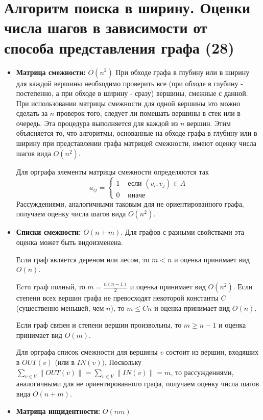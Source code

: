 \documentclass[40pt]{article}
\begin{document}
\section{Алгоритм поиска в ширину. Оценки числа шагов в зависимости от способа представления графа (28)}

\begin{itemize}
    \item \textbf{Матрица смежности: } $O\left(n^{2}\right)$
        При обходе графа в глубину или в ширину для каждой вершины необходимо проверить все (при обходе в глубину - постепенно, а при обходе в ширину - сразу) вершины, смежные с данной. При использовании матрицы смежности для одной вершины это можно сделать за $n$ проверок того, следует ли помешать вершины в стек или в очередь. Эта процедура выполняется для каждой из $n$ вершин. Этим объясняется то, что алгоритмы, основанные на обходе графа в глубину или в ширину при представлении графа матрицей смежности, имеют оценку числа шагов вида $O\left(n^{2}\right)$.

Для орграфа элементы матрицы смежности определяются так
$$
a_{i j}=\left\{\begin{array}{ll}
1 & \text { если }\left(v_{i}, v_{j}\right) \in A \\
0 & \text { иначе }
\end{array}\right.
$$
Рассуждениями, аналогичными таковым для не ориентированного графа, получаем оценку числа шагов вида $O\left(n^{2}\right)$.

    \item \textbf{Списки смежности: } $O(n+m)$. Для графов с разными свойствами эта оценка может быть видоизменена.

Если граф является дереном или лесом, то $m<n$ и оценка принимает вид $O(n)$.

Ecru rpaф полный, то $m=\frac{n(n-1)}{2}$ и оценка принимает вид $O\left(n^{2}\right)$. Если степени всех вершин графа не превосходят некоторой константы $C$ (сушественно меньшей, чем $n$), то $m \leq C n$ и оценка принимает вид $O(n)$.

Если граф связен и степени вершин произвольны, то $m \geq n-1$ и оценка принимает вид $O(m)$.

Для орграфа список смежности для вершины $v$ состоит из вершин, входяших в $O U T(v)$ (или в $I N(v))$, Поскольку $\sum_{v \in V}\|O U T(v)\|=\sum_{v \in V}\|I N(v)\|=m$, то рассуждениями, аналогичными для не ориентированного графа, получаем оценку числа шагов вида $O(n+m)$.
    \item \textbf{Матрица инцидентности: } $O(n m)$
\end{itemize}
\end{document}
